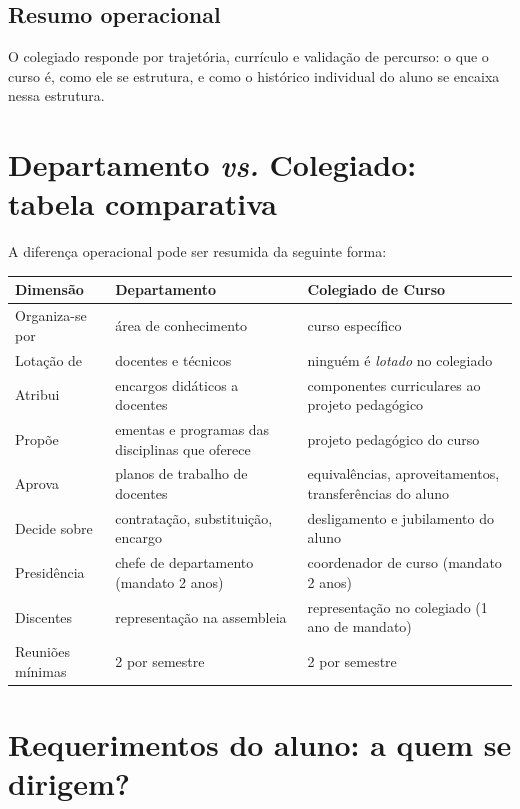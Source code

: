 \documentclass[10pt,a4paper]{extarticle}
\newcommand{\impt}[1]{\textcolor{important}{#1}}
\begin{document}
\subsection{Resumo operacional}

O colegiado responde por \impt{trajetória}, \impt{currículo} e \impt{validação de percurso}: o que o curso é, como ele se estrutura, e como o histórico individual do aluno se encaixa nessa estrutura.

\section{Departamento \emph{vs.} Colegiado: tabela comparativa}

A diferença operacional pode ser resumida da seguinte forma:

\begin{center}
\renewcommand{\arraystretch}{1.35}
\begin{tabularx}{\textwidth}{@{} l X X @{}}
\toprule
\textbf{Dimensão} & \textbf{Departamento} & \textbf{Colegiado de Curso} \\
\midrule
Organiza-se por & área de conhecimento & curso específico \\
Lotação de & docentes e técnicos & ningu\'em é \emph{lotado} no colegiado \\
Atribui & encargos didáticos a docentes & componentes curriculares ao projeto pedagógico \\
Propõe & ementas e programas das disciplinas que oferece & projeto pedagógico do curso \\
Aprova & planos de trabalho de docentes & equivalências, aproveitamentos, transferências do aluno \\
Decide sobre & contratação, substituição, encargo & desligamento e jubilamento do aluno \\
Presidência & chefe de departamento (mandato 2 anos) & coordenador de curso (mandato 2 anos) \\
Discentes & representação na assembleia & representação no colegiado (1 ano de mandato) \\
Reuniões mínimas & 2 por semestre & 2 por semestre \\
\bottomrule
\end{tabularx}
\end{center}

\section{Requerimentos do aluno: a quem se dirigem?}
\end{document}
